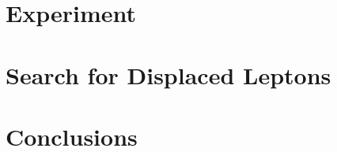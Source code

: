 \documentclass{ucetd}
\begin{document}
\part{Experiment}






\cleardoublepage 

\part{Search for Displaced Leptons}







\cleardoublepage 

\part{Conclusions}

\cleardoublepage 


\printbibliography[heading=bibintoc,title={References}]

%
%
\end{document}

